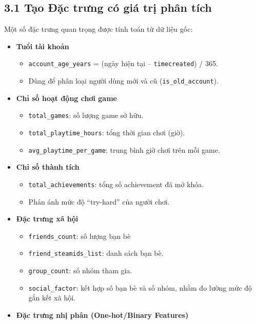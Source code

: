 \documentclass[
  11pt,
]{article}
\providecommand{\tightlist}{%
  \setlength{\itemsep}{0pt}\setlength{\parskip}{0pt}}
\begin{document}
\hypertarget{tux1ea1o-ux111ux1eb7c-trux1b0ng-cuxf3-giuxe1-trux1ecb-phuxe2n-tuxedch}{%
\subsection{3.1 Tạo Đặc trưng có giá trị phân
tích}\label{tux1ea1o-ux111ux1eb7c-trux1b0ng-cuxf3-giuxe1-trux1ecb-phuxe2n-tuxedch}}

Một số đặc trưng quan trọng được tính toán từ dữ liệu gốc:

\begin{itemize}
\tightlist
\item
  \textbf{Tuổi tài khoản}

  \begin{itemize}
  \tightlist
  \item
    \texttt{account\_age\_years} = (ngày hiện tại --
    \texttt{timecreated}) / 365.\\
  \item
    Dùng để phân loại người dùng mới và cũ (\texttt{is\_old\_account}).
  \end{itemize}
\item
  \textbf{Chỉ số hoạt động chơi game}

  \begin{itemize}
  \tightlist
  \item
    \texttt{total\_games}: số lượng game sở hữu.\\
  \item
    \texttt{total\_playtime\_hours}: tổng thời gian chơi (giờ).\\
  \item
    \texttt{avg\_playtime\_per\_game}: trung bình giờ chơi trên mỗi
    game.
  \end{itemize}
\item
  \textbf{Chỉ số thành tích}

  \begin{itemize}
  \tightlist
  \item
    \texttt{total\_achievements}: tổng số achievement đã mở khóa.\\
  \item
    Phản ánh mức độ ``try-hard'' của người chơi.
  \end{itemize}
\item
  \textbf{Đặc trưng xã hội}

  \begin{itemize}
  \tightlist
  \item
    \texttt{friends\_count}: số lượng bạn bè
  \item
    \texttt{friend\_steamids\_list}: danh sách bạn bè.\\
  \item
    \texttt{group\_count}: số nhóm tham gia.\\
  \item
    \texttt{social\_factor}: kết hợp số bạn bè và số nhóm, nhằm đo lường
    mức độ gắn kết xã hội.
  \end{itemize}
\item
  \textbf{Đặc trưng nhị phân (One-hot/Binary Features)}


\end{itemize}
\end{document}
